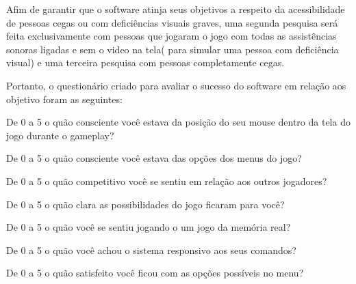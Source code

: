Afim de garantir que o software atinja seus objetivos a respeito da acessibilidade de pessoas cegas ou com deficiências visuais graves, uma segunda pesquisa será feita exclusivamente com pessoas que jogaram o jogo com todas as assistências sonoras ligadas e sem o video na tela( para simular uma pessoa com deficiência visual) e uma terceira pesquisa com pessoas completamente cegas.

Portanto, o questionário criado para avaliar o sucesso do software em relação aos objetivo foram as seguintes:

\begin{questao}
  \item De 0 a 5 o quão consciente você estava da posição do seu mouse dentro da tela do jogo durante o gameplay?
  \item De 0 a 5 o quão consciente você estava das opções dos menus do jogo?
  \item De 0 a 5 o quão competitivo você se sentiu em relação aos outros jogadores?
  \item De 0 a 5 o quão clara as possibilidades do jogo ficaram para você?
  \item De 0 a 5 o quão você se sentiu jogando o um jogo da memória real?
  \item De 0 a 5 o quão você achou o sistema responsivo aos seus comandos?
  \item De 0 a 5 o quão satisfeito você ficou com as opções possíveis no menu? 
\end{questao}
